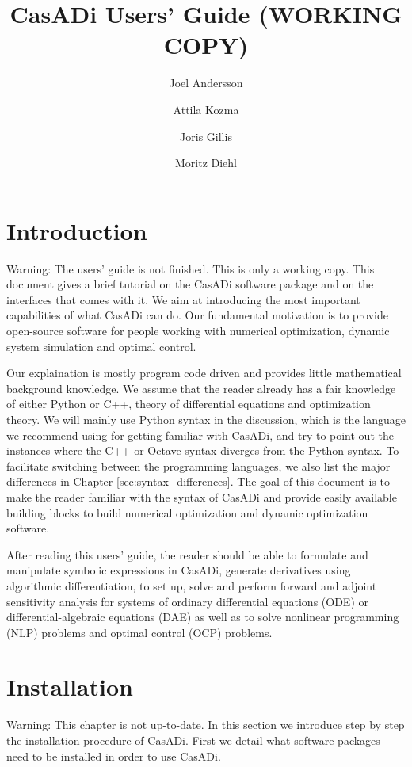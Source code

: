 \documentclass[a4paper,12pt]{book}
\author{Joel Andersson \and Attila Kozma \and Joris Gillis \and Moritz Diehl}
\title{CasADi Users' Guide {\color{red}(WORKING COPY)}}
\begin{document}
\titlepage
\maketitle
\begin{latexonly}
\tableofcontents
\end{latexonly}
\clearpage

\chapter{Introduction}
{\color{red}Warning: The users' guide is not finished. This is only a working copy.}
This document gives a brief tutorial on the CasADi software package and on the interfaces that comes with it. We aim at
introducing the most important capabilities of what CasADi can do. Our fundamental motivation is to provide open-source
software for people working with numerical optimization, dynamic system simulation and optimal control.

Our explaination is mostly program code driven and provides little mathematical background knowledge. We assume that the reader already has a fair knowledge of either Python or C++, theory of differential equations and optimization theory. We will mainly use Python syntax in the discussion, which is the language we recommend using for getting familiar with CasADi, and try to point out the instances where the C++ or Octave syntax diverges from the Python syntax. To facilitate switching between the programming languages, we also list the major differences in Chapter \ref{sec:syntax_differences}. The goal of this document is to make the reader familiar with the syntax of CasADi and provide easily available building blocks to build numerical optimization and dynamic optimization software.

After reading this users' guide, the reader should be able to formulate and manipulate symbolic expressions in CasADi, generate derivatives using algorithmic differentiation, to set up, solve and perform forward and adjoint sensitivity analysis for systems of ordinary differential equations (ODE) or differential-algebraic equations (DAE) as well as to solve nonlinear programming (NLP) problems and optimal control (OCP) problems.

\chapter{Installation}
{\color{red}Warning: This chapter is not up-to-date.}
In this section we introduce step by step the installation procedure of CasADi. First we detail what software packages need to
be installed in order to use CasADi.
\end{document}
